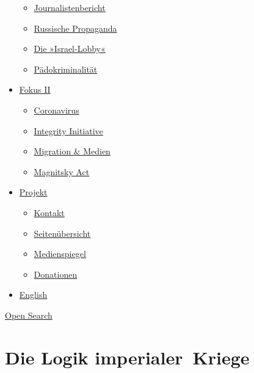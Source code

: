 \begin{itemize}
  \begin{itemize}
  \tightlist
  \item
    \href{https://swprs.org/bericht-eines-journalisten/}{Journalistenbericht}
  \item
    \href{https://swprs.org/russische-propaganda/}{Russische Propaganda}
  \item
    \href{https://swprs.org/die-israel-lobby-fakten-und-mythen/}{Die
    »Israel-Lobby«}
  \item
    \href{https://swprs.org/geopolitik-und-paedokriminalitaet/}{Pädokriminalität}
  \end{itemize}
\item
  \href{https://swprs.org/migration-und-medien/}{Fokus II}

  \begin{itemize}
  \tightlist
  \item
    \href{https://swprs.org/covid-19-hinweis-ii/}{Coronavirus}
  \item
    \href{https://swprs.org/die-integrity-initiative/}{Integrity
    Initiative}
  \item
    \href{https://swprs.org/migration-und-medien/}{Migration \& Medien}
  \item
    \href{https://swprs.org/der-fall-magnitsky/}{Magnitsky Act}
  \end{itemize}
\item
  \href{https://swprs.org/kontakt/}{Projekt}

  \begin{itemize}
  \tightlist
  \item
    \href{https://swprs.org/kontakt/}{Kontakt}
  \item
    \href{https://swprs.org/uebersicht/}{Seitenübersicht}
  \item
    \href{https://swprs.org/medienspiegel/}{Medienspiegel}
  \item
    \href{https://swprs.org/donationen/}{Donationen}
  \end{itemize}
\item
  \href{https://swprs.org/contact/}{English}
\end{itemize}

\protect\hyperlink{}{Open Search}

\hypertarget{die-logik-imperialer-kriege}{%
\section{Die Logik
imperialer~Kriege}\label{die-logik-imperialer-kriege}}

